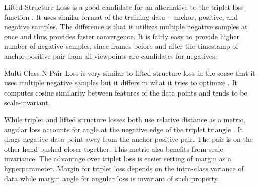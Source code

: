 Lifted Structure Loss is a good candidate for an alternative to the triplet loss function \cite{lifted-structure}. It uses similar format of the training data -- anchor, positive, and negative samples. The difference is that it utilizes multiple negative samples at once and thus provides faster convergence. It is fairly easy to provide higher number of negative samples, since frames before and after the timestamp of anchor-positive pair from all viewpoints are candidates for negatives.

Multi-Class N-Pair Loss is very similar to lifted structure loss in the sense that it uses multiple negative samples but it differs in what it tries to optimize \cite{multiclass-NIPS2016_6b180037}. It computes cosine similarity between features of the data points and tends to be scale-invariant. 

While triplet and lifted structure losses both use relative distance as a metric, angular loss accounts for angle at the negative edge of the triplet triangle \cite{angular-loss}. It drags negative data point away from the anchor-positive pair. The pair is on the other hand pushed closer together. This metric also benefits from scale invariance. The advantage over triplet loss is easier setting of margin as a hyperparameter. Margin for triplet loss depends on the intra-class variance of data while margin angle for angular loss is invariant of such property.
